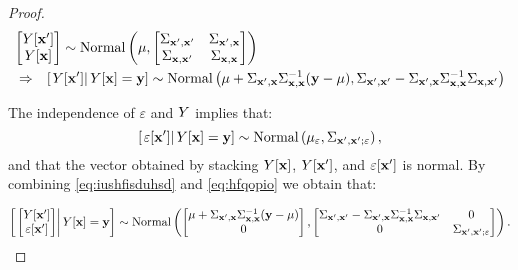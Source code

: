 \begin{proof}

\begin{eqnarray}\lefteqn{\begin{bmatrix}
\Signal[\position']\\
\Signal[\position]
\end{bmatrix}\sim\mathrm{Normal}\left(\mu,\begin{bmatrix}\provar_{\position',\position'}&\provar_{\position',\position}\\
\provar_{\position,\position'}&
\provar_{\position,\position}
\end{bmatrix}\right)}\\
&\Rightarrow&
\left[
\left.\Signal[\position']
\right|
\Signal[\position]=\signal
\right]
\sim\mathrm{Normal}\left(\mu+\Sigma_{\position',\position}\Sigma_{\position,\position}^{-1} (\signal-\mu),\Sigma_{\position',\position'}-\Sigma_{\position',\position}\Sigma_{\position,\position}^{-1}\Sigma_{\position,\position'}\right)\label{eq:hfqopio}\end{eqnarray}

The independence of $\varepsilon$ and $Y$ implies that:
\begin{equation}\label{eq:iushfisduhsd}\left[\left.
\varepsilon[\mathbf{x}']
\right|
Y[\mathbf{x}]=\mathbf{y}
\right]\sim\mathrm{Normal}\left(\mu_\varepsilon,\Sigma_{\mathbf{x}',\mathbf{x}';\varepsilon}\right),\end{equation} and that the vector obtained by stacking $Y[\mathbf{x}]$, $
Y[\mathbf{x}']$, and $\varepsilon[\mathbf{x}']$ is normal. 
By combining \eqref{eq:iushfisduhsd} and \eqref{eq:hfqopio} we obtain that:

$$\left[\left.\begin{bmatrix}
Y[\mathbf{x}']\\
\varepsilon[\mathbf{x}']
\end{bmatrix}\right|
Y[\mathbf{x}]=\mathbf{y}
\right]\sim\mathrm{Normal}\left(\begin{bmatrix}\mu+\Sigma_{\mathbf{x}',\mathbf{x}}\Sigma_{\mathbf{x},\mathbf{x}}^{-1} (\mathbf{y}-\mu)\\0\end{bmatrix},
\begin{bmatrix}\Sigma_{\mathbf{x}',\mathbf{x}'}-\Sigma_{\mathbf{x}',\mathbf{x}}\Sigma_{\mathbf{x},\mathbf{x}}^{-1}\Sigma_{\mathbf{x},\mathbf{x}'}&0\\0&\Sigma_{\mathbf{x}',\mathbf{x}';\varepsilon}\end{bmatrix}\right).$$


\end{proof}
